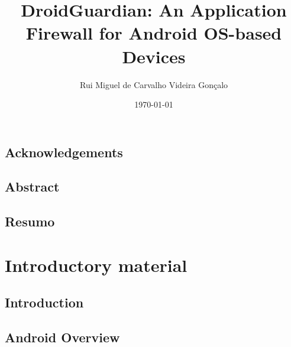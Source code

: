 \documentclass[
  oneside,
  11pt, a4paper,
  footinclude=true,
  headinclude=true,
  cleardoublepage=empty
]{scrbook}
\title{DroidGuardian: An Application Firewall for Android OS-based Devices}
\author{Rui Miguel de Carvalho Videira Gonçalo}
\date{\today}
\begin{document}
	
    
\sf
	\pagestyle{empty}
	
\rm
	\cleardoublepage

\chapter*{Acknowledgements}

	\cleardoublepage
	
\chapter*{Abstract}
	

	\cleardoublepage

\chapter*{Resumo}
	

	\cleardoublepage
	
	\setcounter{page}{3}
	\rm
	
	\cleardoublepage
	\tableofcontents
	
	\cleardoublepage
	\listoffigures
	
	\cleardoublepage
	\listoftables
	
	\cleardoublepage
	\lstlistoflistings
	
	\cleardoublepage
	\setcounter{page}{3}

\part{Introductory material}

\chapter{Introduction}
\label{chap:introduction}


\chapter{Android Overview}
\label{chap:android_overview}

\end{document}
